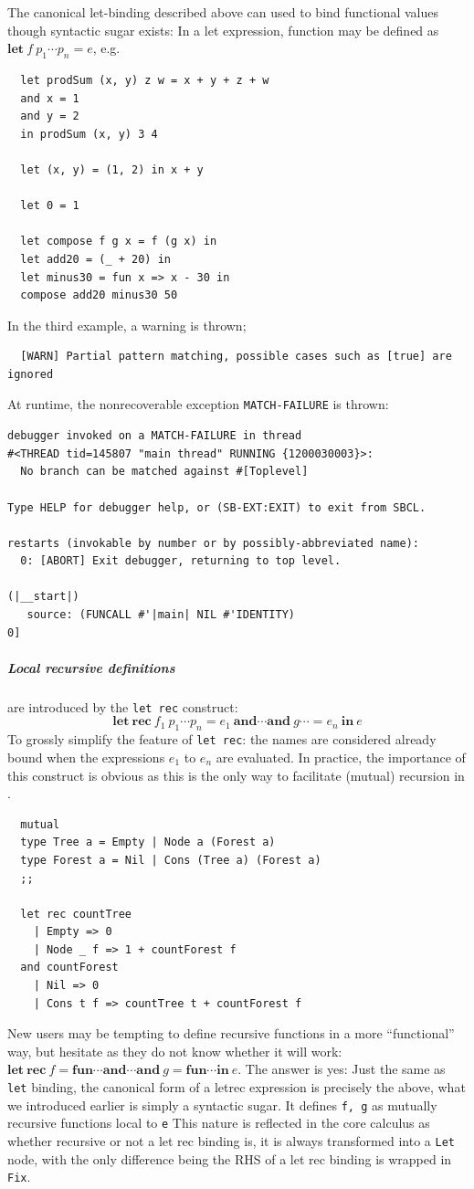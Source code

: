 \documentclass[a4paper, 11pt]{article}
\theoremstyle{remark}\newtheorem*{remark}{Remark}
\theoremstyle{definition}\newtheorem*{definition}{Definition}
\begin{document}
The canonical let-binding described above can used to bind functional values though syntactic sugar exists:
In a let expression, function may be defined as \(\mathbf{let}\ f\ p_1\cdots p_n = e\), e.g.
\begin{verbatim}
  let prodSum (x, y) z w = x + y + z + w
  and x = 1
  and y = 2
  in prodSum (x, y) 3 4

  let (x, y) = (1, 2) in x + y

  let 0 = 1

  let compose f g x = f (g x) in
  let add20 = (_ + 20) in
  let minus30 = fun x => x - 30 in
  compose add20 minus30 50
\end{verbatim}
In the third example, a warning is thrown;
\begin{Verbatim}
  [WARN] Partial pattern matching, possible cases such as [true] are ignored
\end{Verbatim}
At runtime, the nonrecoverable exception \texttt{MATCH-FAILURE} is thrown:
\begin{Verbatim}
debugger invoked on a MATCH-FAILURE in thread
#<THREAD tid=145807 "main thread" RUNNING {1200030003}>:
  No branch can be matched against #[Toplevel]

Type HELP for debugger help, or (SB-EXT:EXIT) to exit from SBCL.

restarts (invokable by number or by possibly-abbreviated name):
  0: [ABORT] Exit debugger, returning to top level.

(|__start|)
   source: (FUNCALL #'|main| NIL #'IDENTITY)
0]
\end{Verbatim}
\subparagraph{Local recursive definitions} are introduced by the \texttt{let rec} construct:
\[
  \mathbf{let\ rec}\ f_1\ p_1\cdots p_n = e_1\
  \mathbf{and}\cdots \mathbf{and}\ g\cdots = e_n\
  \mathbf{in}\ e
\]
To grossly simplify the feature of \texttt{let rec}:
the names are considered already bound when the expressions \(e_1\) to \(e_n\) are evaluated.
In practice, the importance of this construct is obvious as this is
the only way to facilitate (mutual) recursion in \Tigris.
\begin{verbatim}
  mutual
  type Tree a = Empty | Node a (Forest a)
  type Forest a = Nil | Cons (Tree a) (Forest a)
  ;;

  let rec countTree
    | Empty => 0
    | Node _ f => 1 + countForest f
  and countForest
    | Nil => 0
    | Cons t f => countTree t + countForest f
\end{verbatim}

New users may be tempting to define recursive functions in a more ``functional'' way, but hesitate as
they do not know whether it will work:
\(\mathbf{let\ rec}\ f = \mathbf{fun}\cdots\mathbf{and}\cdots \mathbf{and}\ g = \mathbf{fun}\cdots
  \mathbf{in}\ e
\).
The answer is yes: Just the same as \texttt{let} binding, the canonical form of a letrec expression is
precisely the above, what we introduced earlier is simply a syntactic sugar. It defines \texttt{f, g} as
mutually recursive functions local to \texttt{e} This nature is reflected
in the core calculus as whether recursive or not a let rec binding is, it is always transformed
into a \texttt{Let} node, with the only difference being the RHS of a let rec binding is wrapped in \texttt{Fix}.
\end{document}
